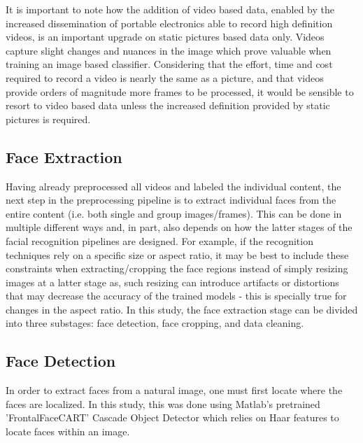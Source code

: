 \documentclass[11pt]{article}
\begin{document}
        It is important to note how the addition of video based data, enabled by the increased dissemination of portable electronics able to record high definition videos, is an important upgrade on static pictures based data only. Videos capture slight changes and nuances in the image which prove valuable when training an image based classifier. Considering that the effort, time and cost required to record a video is nearly the same as a picture, and that videos provide orders of magnitude more frames to be processed, it would be sensible to resort to video based data unless the increased definition provided by static pictures is required.

    \subsection{Face Extraction}
        Having already preprocessed all videos and labeled the individual content, the next step in the preprocessing pipeline is to extract individual faces from the entire content (i.e. both single and group images/frames). This can be done in multiple different ways and, in part, also depends on how the latter stages of the facial recognition pipelines are designed. For example, if the recognition techniques rely on a specific size or aspect ratio, it may be best to include these constraints when extracting/cropping the face regions instead of simply resizing images at a latter stage as, such resizing can introduce artifacts or distortions that may decrease the accuracy of the trained models - this is specially true for changes in the aspect ratio. In this study, the face extraction stage can be divided into three substages: face detection, face cropping, and data cleaning.

        \subsection{Face Detection}
            In order to extract faces from a natural image, one must first locate where the faces are localized. In this study, this was done using Matlab's pretrained 'FrontalFaceCART' Cascade Object Detector which relies on Haar features to locate faces within an image.
\end{document}
